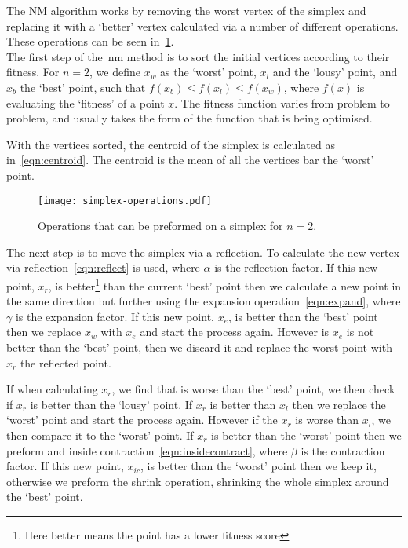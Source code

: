 The NM algorithm works by removing the worst vertex of the simplex and replacing it with a `better' vertex calculated via a number of different operations.
These operations can be seen in~\cref{fig:NM-operations}.\\

The first step of the~\gls*{nm} method is to sort the initial vertices according to their fitness.
For $n=2$, we define $x_w$ as the `worst' point, $x_l$ and the `lousy' point, and $x_b$ the `best' point, such that $f(x_b)\leq f(x_l)\leq f(x_w)$, where $f(x)$ is evaluating the `fitness' of a point $x$. 
The fitness function varies from problem to problem, and usually takes the form of the function that is being optimised.

With the vertices sorted, the centroid of the simplex is calculated as in~\cref{eqn:centroid}.
The centroid is the mean of all the vertices bar the `worst' point.

\begin{figure}[!htbp]
    \centering
    \texttt{[image: simplex-operations.pdf]}
    \caption{Operations that can be preformed on a simplex for $n=2$.}
    \label{fig:NM-operations}
\end{figure}

The next step is to move the simplex via a reflection.
To calculate the new vertex via reflection~\cref{eqn:reflect} is used, where $\alpha$ is the reflection factor.
If this new point, $x_r$, is better\footnote{Here better means the point has a lower fitness score} than the current `best' point then we calculate a new point in the same direction but further using the expansion operation~\cref{eqn:expand}, where $\gamma$ is the expansion factor.
If this new point, $x_e$, is better than the `best' point then we replace $x_w$ with $x_e$ and start the process again.
However is $x_e$ is not better than the `best' point, then we discard it and replace the worst point with $x_r$ the reflected point.

If when calculating $x_r$, we find that is worse than the `best' point, we then check if $x_r$ is better than the `lousy' point.
If $x_r$ is better than $x_l$ then we replace the `worst' point and start the process again.
However if the $x_r$ is worse than $x_l$, we then compare it to the `worst' point.
If $x_r$ is better than the `worst' point then we preform and inside contraction~\cref{eqn:insidecontract}, where $\beta$ is the contraction factor.
If this new point, $x_{ic}$, is better than the `worst' point then we keep it, otherwise we preform the shrink operation, shrinking the whole simplex around the `best' point.

